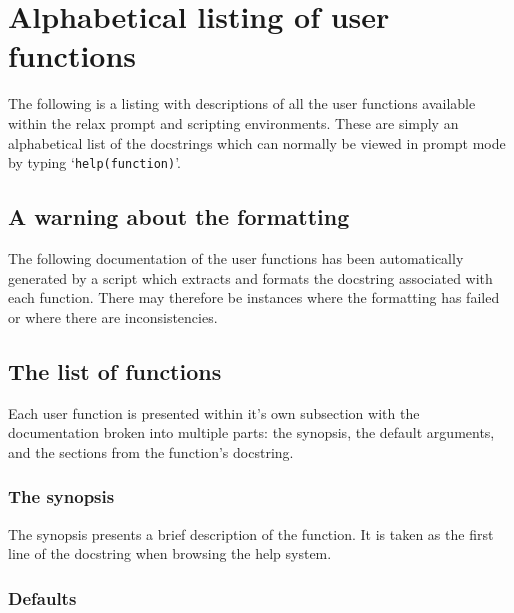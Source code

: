 
\chapter{Alphabetical listing of user functions}

The following is a listing with descriptions of all the user functions available within the relax prompt and scripting environments.  These are simply an alphabetical list of the docstrings which can normally be viewed in prompt mode by typing `\texttt{help(function)}'.





\section{A warning about the formatting}

The following documentation of the user functions has been automatically generated by a script which extracts and formats the docstring associated with each function.  There may therefore be instances where the formatting has failed or where there are inconsistencies.




\section{The list of functions}

Each user function is presented within it's own subsection with the documentation broken into multiple parts:  the synopsis, the default arguments, and the sections from the function's docstring.


\subsection{The synopsis}

The synopsis presents a brief description of the function.  It is taken as the first line of the docstring when browsing the help system.


\subsection{Defaults}

